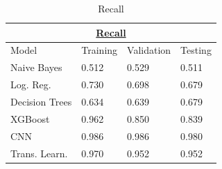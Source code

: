 \documentclass[10pt,twocolumn,letterpaper]{article}
\begin{document}
\begin{table}[]
   \begin{tabular}{|llll|}
   \hline
   \multicolumn{4}{|c|}{{\ul \textbf{Recall}}}                                                                      \\ \hline
   \multicolumn{1}{|l|}{Model}          & \multicolumn{1}{l|}{Training} & \multicolumn{1}{l|}{Validation} & Testing \\ \hline
   \multicolumn{1}{|l|}{Naive Bayes}    & \multicolumn{1}{l|}{0.512}    & \multicolumn{1}{l|}{0.529}      & 0.511   \\ \hline
   \multicolumn{1}{|l|}{Log. Reg.}      & \multicolumn{1}{l|}{0.730}    & \multicolumn{1}{l|}{0.698}      & 0.679   \\ \hline
   \multicolumn{1}{|l|}{Decision Trees} & \multicolumn{1}{l|}{0.634}    & \multicolumn{1}{l|}{0.639}      & 0.679   \\ \hline
   \multicolumn{1}{|l|}{XGBoost}        & \multicolumn{1}{l|}{0.962}    & \multicolumn{1}{l|}{0.850}      & 0.839   \\ \hline
   \multicolumn{1}{|l|}{CNN}            & \multicolumn{1}{l|}{0.986}    & \multicolumn{1}{l|}{0.986}      & 0.980   \\ \hline
   \multicolumn{1}{|l|}{Trans. Learn.}  & \multicolumn{1}{l|}{0.970}    & \multicolumn{1}{l|}{0.952}      & 0.952   \\ \hline
   \end{tabular}

   \caption{Recall}
\end{table}
\end{document}
